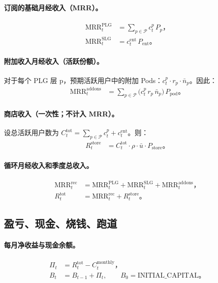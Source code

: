\documentclass[11点, A4纸, 单面]{article}
\begin{document}
\paragraph{订阅的基础月经收入（MRR）。}
\begin{align}
\mathrm{MRR}^{\mathrm{PLG}}_t &= \sum_{p \in \mathcal{P}} c^p_t \, P_p，\\
\mathrm{MRR}^{\mathrm{SLG}}_t &= c^{\mathrm{ent}}_t \, P_{\mathrm{ent}}。
\end{align}

\paragraph{附加收入月经收入（活跃份额）。}
对于每个 PLG 层 p，预期活跃用户中的附加 Pods：$c^p_t \cdot r_p \cdot \bar{n}_p$。因此：
\begin{align}
\mathrm{MRR}^{\mathrm{addons}}_t 
  &= \sum_{p \in \mathcal{P}} \bigl(c^p_t \, r_p \, \bar{n}_p\bigr)\, P_{\mathrm{pod}}。
\end{align}

\paragraph{商店收入（一次性；不计入 MRR）。}
设总活跃用户数为 $C^{\mathrm{tot}}_t = \sum_{p \in \mathcal{P}} c^p_t + c^{\mathrm{ent}}_t$。则：
\begin{align}
R^{\mathrm{store}}_t 
  &= C^{\mathrm{tot}}_t \cdot \rho \cdot \bar{u} \cdot P_{\mathrm{store}}。
\end{align}

\paragraph{循环月经收入和季度总收入。}
\begin{align}
\mathrm{MRR}^{\mathrm{rec}}_t 
  &= \mathrm{MRR}^{\mathrm{PLG}}_t + \mathrm{MRR}^{\mathrm{SLG}}_t + \mathrm{MRR}^{\mathrm{addons}}_t，\\
R^{\mathrm{tot}}_t 
  &= \mathrm{MRR}^{\mathrm{rec}}_t + R^{\mathrm{store}}_t。
\end{align}

\subsection{盈亏、现金、烧钱、跑道}
\paragraph{每月净收益与现金余额。}
\begin{align}
\Pi_t &= R^{\mathrm{tot}}_t - C^{\mathrm{monthly}}_t，\\
B_t &= B_{t-1} + \Pi_t, \qquad B_0 = \text{INITIAL\_CAPITAL}。
\end{align}
\end{document}
